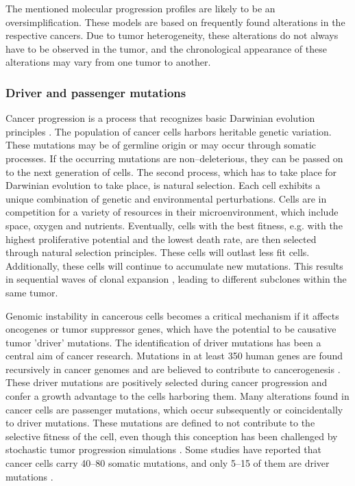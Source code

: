     The mentioned molecular progression profiles are likely to be an
    oversimplification. These models are based on frequently found alterations
    in the respective cancers. Due to tumor heterogeneity, these alterations do
    not always have to be observed in the tumor, and the chronological
    appearance of these alterations may vary from one tumor to another.

    \subsubsection{Driver and passenger mutations}

      Cancer progression is a process that recognizes basic Darwinian evolution
      principles {\cite{clonal_evolution}} {\cite{darwinian_models}}
      {\cite{war_zone}} {\cite{cancer_models}}. The population of cancer cells
      harbors heritable genetic variation. These mutations may be of germline
      origin or may occur through somatic processes. If the occurring mutations
      are non--deleterious, they can be passed on to the next generation of cells.
      The second process, which has to take place for Darwinian evolution to take
      place, is natural selection. Each cell exhibits a unique combination of
      genetic and environmental perturbations. Cells are in competition for a
      variety of resources in their microenvironment, which include space, oxygen
      and nutrients. Eventually, cells with the best fitness, e.g. with the
      highest proliferative potential and the lowest death rate, are then selected
      through natural selection principles. These cells will outlast less fit
      cells. Additionally, these cells will continue to accumulate new mutations.
      This results in sequential waves of clonal expansion
      {\cite{clonal_evolution}}, leading to different subclones within the same
      tumor.

      Genomic instability in cancerous cells becomes a critical mechanism if it
      affects oncogenes or tumor suppressor genes, which have the potential to
      be causative tumor 'driver' mutations. The identification of driver
      mutations has been a central aim of cancer research. Mutations in at least
      350 human genes are found recursively in cancer genomes and are believed
      to contribute to cancerogenesis {\cite{cancer_genome}}. These driver
      mutations are positively selected during cancer progression and confer a
      growth advantage to the cells harboring them. Many alterations found in
      cancer cells are passenger mutations, which occur subsequently or
      coincidentally to driver mutations. These mutations are defined to not
      contribute to the selective fitness of the cell, even though this
      conception has been challenged by stochastic tumor progression simulations
      {\cite{stochastic_cancer}}. Some studies have reported that cancer cells
      carry 40--80 somatic mutations, and only 5--15 of them are driver
      mutations {\cite{som_mut}}.

